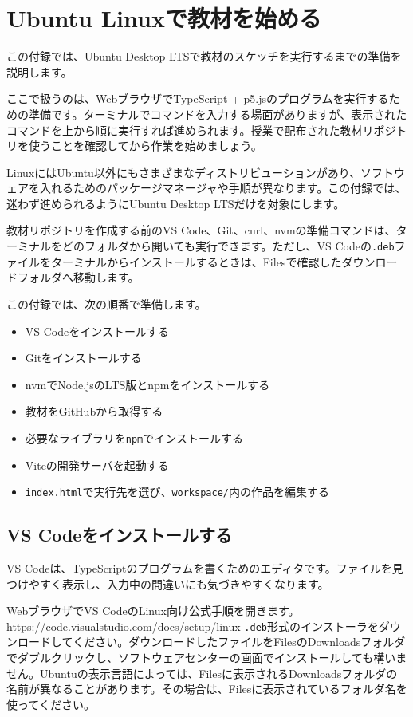 \chapter{Ubuntu Linuxで教材を始める}
\label{app:ubuntu-setup}

この付録では、Ubuntu Desktop LTSで教材のスケッチを実行するまでの準備を説明します。

ここで扱うのは、WebブラウザでTypeScript + p5.jsのプログラムを実行するための準備です。ターミナルでコマンドを入力する場面がありますが、表示されたコマンドを上から順に実行すれば進められます。授業で配布された教材リポジトリを使うことを確認してから作業を始めましょう。

LinuxにはUbuntu以外にもさまざまなディストリビューションがあり、ソフトウェアを入れるためのパッケージマネージャや手順が異なります。この付録では、迷わず進められるようにUbuntu Desktop LTSだけを対象にします。

教材リポジトリを作成する前のVS Code、Git、curl、nvmの準備コマンドは、ターミナルをどのフォルダから開いても実行できます。ただし、VS Codeの\texttt{.deb}ファイルをターミナルからインストールするときは、Filesで確認したダウンロードフォルダへ移動します。

この付録では、次の順番で準備します。

\begin{itemize}
    \item VS Codeをインストールする
    \item Gitをインストールする
    \item nvmでNode.jsのLTS版とnpmをインストールする
    \item 教材をGitHubから取得する
    \item 必要なライブラリを\texttt{npm}でインストールする
    \item Viteの開発サーバを起動する
    \item \texttt{index.html}で実行先を選び、\texttt{workspace/}内の作品を編集する
\end{itemize}

\section{VS Codeをインストールする}

VS Codeは、TypeScriptのプログラムを書くためのエディタです。ファイルを見つけやすく表示し、入力中の間違いにも気づきやすくなります。

WebブラウザでVS CodeのLinux向け公式手順を開きます。
\url{https://code.visualstudio.com/docs/setup/linux}
\texttt{.deb}形式のインストーラをダウンロードしてください。ダウンロードしたファイルをFilesのDownloadsフォルダでダブルクリックし、ソフトウェアセンターの画面でインストールしても構いません。Ubuntuの表示言語によっては、Filesに表示されるDownloadsフォルダの名前が異なることがあります。その場合は、Filesに表示されているフォルダ名を使ってください。

